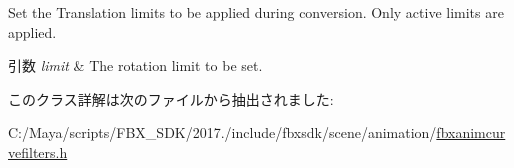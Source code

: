 Set the Translation limits to be applied during conversion. Only active limits are applied. 
\begin{DoxyParams}{引数}
{\em limit} & The rotation limit to be set. \\
\hline
\end{DoxyParams}


このクラス詳解は次のファイルから抽出されました\+:\begin{DoxyCompactItemize}
\item 
C\+:/\+Maya/scripts/\+F\+B\+X\+\_\+\+S\+D\+K/2017./include/fbxsdk/scene/animation/\hyperlink{fbxanimcurvefilters_8h}{fbxanimcurvefilters.\+h}\end{DoxyCompactItemize}
